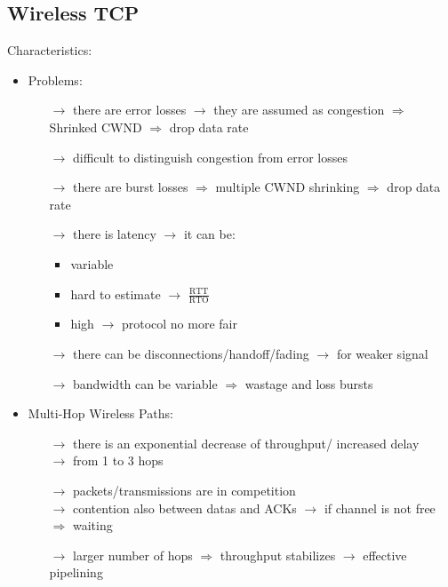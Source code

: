 \subsection{Wireless TCP}
Characteristics:
\begin{itemize}
    \item Problems:
    \begin{itemize}
        \item[$\rightarrow$] there are error losses $\rightarrow$ they are assumed
        as congestion $\Rightarrow$ Shrinked CWND $\Rightarrow$ drop data rate
        \item[$\rightarrow$] difficult to distinguish congestion from error losses
        \item[$\rightarrow$] there are burst losses $\Rightarrow$ multiple CWND
        shrinking $\Rightarrow$ drop data rate
        \item[$\rightarrow$] there is latency $\rightarrow$ it can be:
        \begin{itemize}
            \item variable
            \item hard to estimate $\rightarrow$ $\frac{\text{RTT}}{\text{RTO}}$
            \item high $\rightarrow$ protocol no more fair
        \end{itemize}
        \item[$\rightarrow$] there can be disconnections/handoff/fading $\rightarrow$
        for weaker signal
        \item[$\rightarrow$] bandwidth can be variable $\Rightarrow$ wastage and loss bursts
    \end{itemize}
    \item Multi-Hop Wireless Paths:
    \begin{itemize}
        \item[$\rightarrow$] there is an exponential decrease of throughput/ increased delay\\
        $\rightarrow$ from 1 to 3 hops
        \item[$\rightarrow$] packets/transmissions are in competition\\
        $\rightarrow$ contention also between datas and ACKs $\rightarrow$ if channel is
        not free\\$\Rightarrow$ waiting
        \item[$\rightarrow$] larger number of hops $\Rightarrow$ throughput stabilizes
        $\rightarrow$ effective pipelining 
    \end{itemize}

\end{itemize}
